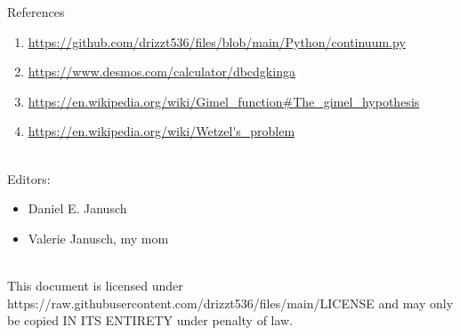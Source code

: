 \documentclass[12pt]{article}
\begin{document}
\begin{section}{References}
\begin{enumerate}
		\item\url{https://github.com/drizzt536/files/blob/main/Python/continuum.py}\\
		\label{ref:python second enum family}

		\item\url{https://www.desmos.com/calculator/dbcdgkinga}\\
		\label{ref:desmos second enum family}

		\item\url{https://en.wikipedia.org/wiki/Gimel\_function\#The\_gimel\_hypothesis}\\
		\label{ref:gimel}

		\item\url{https://en.wikipedia.org/wiki/Wetzel's\_problem}\\
		\label{ref:wetzel}
	\end{enumerate}\\
	Editors:
	\begin{itemize}
		\item Daniel E. Janusch
		\item Valerie Janusch, my mom
	\end{itemize}
	\vspace{3em}\\
	This document is licensed under https://raw.githubusercontent.com/drizzt536/files/main/LICENSE
	and may only be copied IN ITS ENTIRETY under penalty of law.
\end{section}
\end{document}
